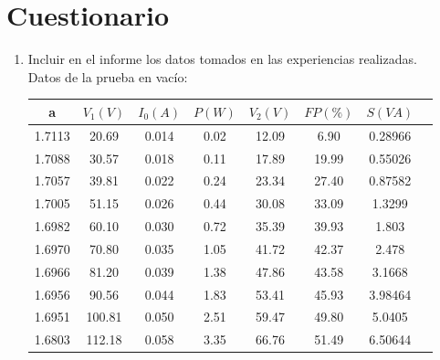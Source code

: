 \documentclass[12pt]{article}
\begin{document}
\section{Cuestionario}
\begin{enumerate}
    \item Incluir en el informe los datos tomados en las experiencias realizadas.\\
    Datos de la prueba en vacío\cite{labo}:
    \begin{center}
        \begin{tabular}{ |c|c|c|c|c|c|c|c| } 
            \hline
            a & $V_{1}(V)$ & $I_{0}(A)$ & $P(W)$ & $V_{2}(V)$ & $FP(\%)$ & $S(VA)$ \\
            \hline
            1.7113 & 20.69 & 0.014 & 0.02 & 12.09 & 6.90 & 0.28966 \\ 
            1.7088 & 30.57 & 0.018 & 0.11 & 17.89 & 19.99 & 0.55026 \\ 
            1.7057 & 39.81 & 0.022 & 0.24 & 23.34 & 27.40 & 0.87582 \\ 
            1.7005 & 51.15 & 0.026 & 0.44 & 30.08 & 33.09 & 1.3299 \\ 
            1.6982 & 60.10 & 0.030 & 0.72 & 35.39 & 39.93 & 1.803 \\ 
            1.6970 & 70.80 & 0.035 & 1.05 & 41.72 & 42.37 & 2.478 \\ 
            1.6966 & 81.20 & 0.039 & 1.38 & 47.86 & 43.58 & 3.1668 \\ 
            1.6956 & 90.56 & 0.044 & 1.83 & 53.41 & 45.93 & 3.98464 \\ 
            1.6951 & 100.81 & 0.050 & 2.51 & 59.47 & 49.80 & 5.0405 \\ 
            1.6803 & 112.18 & 0.058 & 3.35 & 66.76 & 51.49 & 6.50644 \\ 
            \hline
        \end{tabular}
    \end{center}
    

\end{enumerate}
\end{document}
